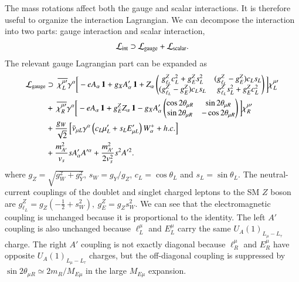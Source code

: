 \documentclass[onecolumn, aps, nofootinbib, prd, preprint, floats, floatfix, amsmath, amssymb, superscriptaddress, preprintnumbers]{revtex4-2}
\begin{document}
The mass rotations affect both the gauge and scalar interactions. It is therefore useful to organize the interaction Lagrangian. We can decompose the interaction into two parts: gauge interaction and scalar interaction,
\begin{equation}
    \mathcal{L}_{\rm int}\supset \mathcal{L}_{\rm gauge} + \mathcal{L}_{\rm scalar}.
\end{equation}
The relevant gauge Lagrangian part can be expanded as
\begin{equation}
\begin{aligned}
\mathcal{L}_{\rm gauge}
&\supset~
\overline{\chi^{\mu\prime}_L}\gamma^\alpha
\bigg[-eA_\alpha\,\mathbf{1}+g_X A'_\alpha\,\mathbf{1} +Z_\alpha
\begin{pmatrix}
g_{\ell_L}^Z c_L^2+g_E^Z s_L^2 & (g_{\ell_L}^Z-g_E^Z)c_Ls_L\\
(g_{\ell_L}^Z-g_E^Z)c_Ls_L & g_{\ell_L}^Z s_L^2+g_E^Z c_L^2
\end{pmatrix}
\bigg] \chi^{\mu\prime}_L\\
&+~\overline{\chi^{\mu\prime}_R}\gamma^\alpha
\bigg[ -eA_\alpha\,\mathbf{1} +g_E^ZZ_\alpha\,\mathbf{1} -g_XA'_\alpha
\begin{pmatrix}
\cos2\theta_{\mu R} & \sin2\theta_{\mu R}\\
\sin2\theta_{\mu R} & -\cos2\theta_{\mu R}
\end{pmatrix}\bigg]\chi^{\mu\prime}_R\\
&+\frac{g_W}{\sqrt2}
\left[
\bar\nu_{\mu L}\gamma^\alpha
\left(c_L\mu'_L+s_L E'_{\mu L}\right)W^+_\alpha
+h.c.
\right]\\
&+ \frac{m_{A'}^2}{v_s}s A'_\alpha A'^\alpha + \frac{m_{A'}^2}{2 v_s^2}s^2 A'^2.
\end{aligned}
\label{eq:mass-basis-NC}
\end{equation} 
where $g_Z=\sqrt{g_W^2+g_Y^2}$, $s_W=g_Y/g_Z$, $c_L=\cos\theta_L$ and $s_L=\sin\theta_L$. The neutral-current couplings of the doublet and singlet charged leptons to the SM $Z$ boson are $g_{\ell_L}^Z=g_Z\left(-\frac12+s_W^2\right), ~g_E^Z=g_Z s_W^2$. We can see that the electromagnetic coupling is unchanged because it is proportional to the identity. The left $A'$ coupling is also unchanged because $\ell_L^\mu$ and $E_L^\mu$ carry the same $U_A(1)_{L_\mu-L_\tau}$ charge. The right $A'$ coupling is not exactly diagonal because $\ell_R^\mu$ and $E_R^\mu$ have opposite $U_A(1)_{L_\mu-L_\tau}$ charges, but the off-diagonal coupling is suppressed by $\sin2\theta_{\mu R}\simeq 2m_R/M_{E\mu}$ in the large $M_{E\mu}$ expansion.
\end{document}
